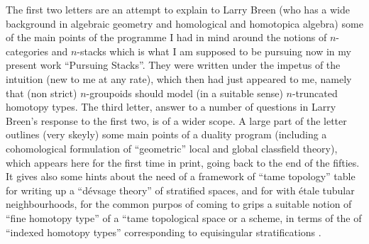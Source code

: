 The first two letters are an attempt to explain to Larry Breen (who has a wide background in algebraic geometry and homological and homotopica algebra) some of the main points of the programme I had in mind around the notions of $n$-categories and $n$-stacks\deleted{,} \handwritten{(}which is what I am supposed to be pursuing now in my present work ``Pursuing Stacks''\handwritten{)}. They were written under the impetus of the  intuition  (new to me at any rate), which then had just appeared to me, namely that (non strict) $n$-groupoids should model (in a suitable sense) $n$-truncated homotopy types.\handwritten{\(\mathord{/\mkern-5mu/}\)} The third letter,  answer to a number of questions in Larry Breen's response to the first two, is of a wider scope. A large part of the letter outlines (very skeyly) some main points of a duality program (including a cohomological formulation of ``geometric'' local and global classfield theory), which appears here for the first time in print,  going back to the end of the fifties. It gives also some hints about the need of a framework of ``tame topology'' table for writing up a ``dévsage theory'' of stratified spaces, and for  with étale tubular neighbourhoods, for the common purpos of coming to grips  a suitable notion of ``fine homotopy type'' of a ``tame topological space or  a scheme, in terms of the  of ``indexed homotopy types'' corresponding to equisingular stratifications .
\noindent{}\par
\noindent{}\par
\noindent{}\par
\noindent\hspace*{1em}\par
\noindent\hspace*{1em}\par
